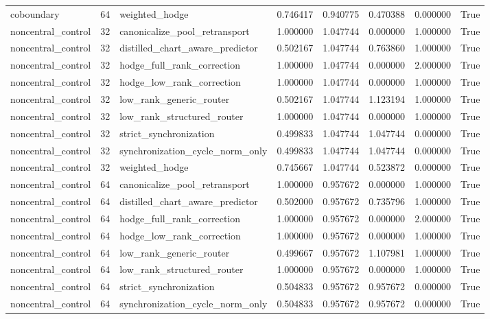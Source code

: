 \begin{tabular}{lrlrrrrr}
coboundary & 64 & weighted_hodge & 0.746417 & 0.940775 & 0.470388 & 0.000000 & True \\
noncentral_control & 32 & canonicalize_pool_retransport & 1.000000 & 1.047744 & 0.000000 & 1.000000 & True \\
noncentral_control & 32 & distilled_chart_aware_predictor & 0.502167 & 1.047744 & 0.763860 & 1.000000 & True \\
noncentral_control & 32 & hodge_full_rank_correction & 1.000000 & 1.047744 & 0.000000 & 2.000000 & True \\
noncentral_control & 32 & hodge_low_rank_correction & 1.000000 & 1.047744 & 0.000000 & 1.000000 & True \\
noncentral_control & 32 & low_rank_generic_router & 0.502167 & 1.047744 & 1.123194 & 1.000000 & True \\
noncentral_control & 32 & low_rank_structured_router & 1.000000 & 1.047744 & 0.000000 & 1.000000 & True \\
noncentral_control & 32 & strict_synchronization & 0.499833 & 1.047744 & 1.047744 & 0.000000 & True \\
noncentral_control & 32 & synchronization_cycle_norm_only & 0.499833 & 1.047744 & 1.047744 & 0.000000 & True \\
noncentral_control & 32 & weighted_hodge & 0.745667 & 1.047744 & 0.523872 & 0.000000 & True \\
noncentral_control & 64 & canonicalize_pool_retransport & 1.000000 & 0.957672 & 0.000000 & 1.000000 & True \\
noncentral_control & 64 & distilled_chart_aware_predictor & 0.502000 & 0.957672 & 0.735796 & 1.000000 & True \\
noncentral_control & 64 & hodge_full_rank_correction & 1.000000 & 0.957672 & 0.000000 & 2.000000 & True \\
noncentral_control & 64 & hodge_low_rank_correction & 1.000000 & 0.957672 & 0.000000 & 1.000000 & True \\
noncentral_control & 64 & low_rank_generic_router & 0.499667 & 0.957672 & 1.107981 & 1.000000 & True \\
noncentral_control & 64 & low_rank_structured_router & 1.000000 & 0.957672 & 0.000000 & 1.000000 & True \\
noncentral_control & 64 & strict_synchronization & 0.504833 & 0.957672 & 0.957672 & 0.000000 & True \\
noncentral_control & 64 & synchronization_cycle_norm_only & 0.504833 & 0.957672 & 0.957672 & 0.000000 & True \\

\end{tabular}
